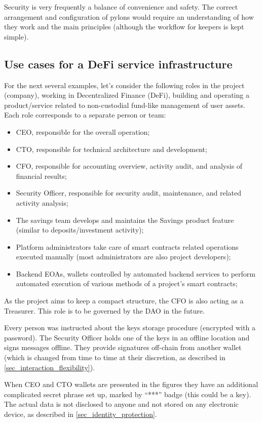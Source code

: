 \documentclass[12pt]{article}
\begin{document}
Security is very frequently a balance of convenience and safety. The correct arrangement and configuration of pylons would require an understanding of how they work and the main principles (although the workflow for keepers is kept simple).

\pagebreak
\subsection{Use cases for a DeFi service infrastructure}

For the next several examples, let’s consider the following roles in the project (company), working in Decentralized Finance (DeFi), building and operating a product/service related to non-custodial fund-like management of user assets. Each role corresponds to a separate person or team:
\begin{itemize}
\item{CEO, responsible for the overall operation;}
\item{CTO, responsible for technical architecture and development;}
\item{CFO, responsible for accounting overview, activity audit, and analysis of financial results;}
\item{Security Officer, responsible for security audit, maintenance, and related activity analysis;}
\item{The savings team develops and maintains the Savings product feature (similar to deposits/investment activity);}
\item{Platform administrators take care of smart contracts related operations executed manually (most administrators are also project developers);}
\item{Backend EOAs, wallets controlled by automated backend services to perform automated execution of various methods of a project's smart contracts;}
\end{itemize}
As the project aims to keep a compact structure, the CFO is also acting as a Treasurer. This role is to be governed by the DAO in the future.

Every person was instructed about the keys storage procedure (encrypted with a password). The Security Officer holds one of the keys in an offline location and signs messages offline. They provide signatures off-chain from another wallet (which is changed from time to time at their discretion, as described in \ref{sec_interaction_flexibility}).

When CEO and CTO wallets are presented in the figures they have an additional complicated secret phrase set up, marked by “***” badge (this could be a key). The actual data is not disclosed to anyone and not stored on any electronic device, as described in \ref{sec_identity_protection}.
\end{document}
